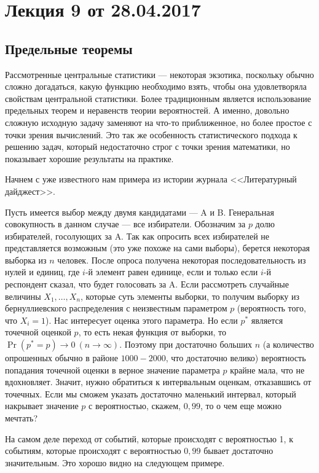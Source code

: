 \section{Лекция 9 от 28.04.2017}
\subsection{Предельные теоремы}
Рассмотренные центральные статистики --- некоторая экзотика, поскольку обычно сложно догадаться, какую функцию необходимо взять, чтобы она удовлетворяла свойствам центральной статистики.
Более традиционным является использование предельных теорем и неравенств теории вероятностей.
А именно, довольно сложную исходную задачу заменяют на что-то приближенное, но более простое с точки зрения вычислений.
Это так же особенность статистического подхода к решению задач, который
недостаточно строг с точки зрения математики, но показывает хорошие результаты на практике.

Начнем с уже известного нам примера из истории журнала <<Литературный дайджест>>.
\begin{example}
    Пусть имеется выбор между двумя кандидатами --- A и B.
    Генеральная совокупность в данном случае --- все избиратели.
    Обозначим за $p$ долю избирателей, госолующих за A.
    Так как опросить всех избирателей не представляется возможным (это уже похоже на сами выборы), берется некоторая выборка из $n$ человек.
    После опроса получена некоторая последовательность из нулей и единиц, где $i$-й элемент равен единице, если и только если $i$-й респондент сказал, что будет голосовать за A.
    Если рассмотреть случайные величины $X_1, \ldots, X_n$, которые суть элементы выборки, то получим выборку из бернуллиевского распределения с неизвестным параметром $p$ (вероятность того, что $X_i = 1$).
    Нас интересует оценка этого параметра.
    Но если $p^*$ является точечной оценкой $p$, то есть некая функция от выборки, то $\Pr(p^* = p) \longrightarrow 0\ (n \to \infty)$.
    Поэтому при достаточно больших $n$ (а количество опрошенных обычно в районе $1000-2000$, что достаточно велико) вероятность попадания точечной оценки в верное значение параметра $p$ крайне мала, что не вдохновляет.
    Значит, нужно обратиться к интервальным оценкам, отказавшись от точечных.
    Если мы сможем указать достаточно маленький интервал, который накрывает значение $p$ с вероятностью, скажем, $0,99$, то о чем еще можно мечтать?
\end{example}

На самом деле переход от событий, которые происходят с вероятностью 1, к событиям, которые происходят с вероятностью $0,99$ бывает достаточно значительным. Это хорошо видно на следующем примере.

